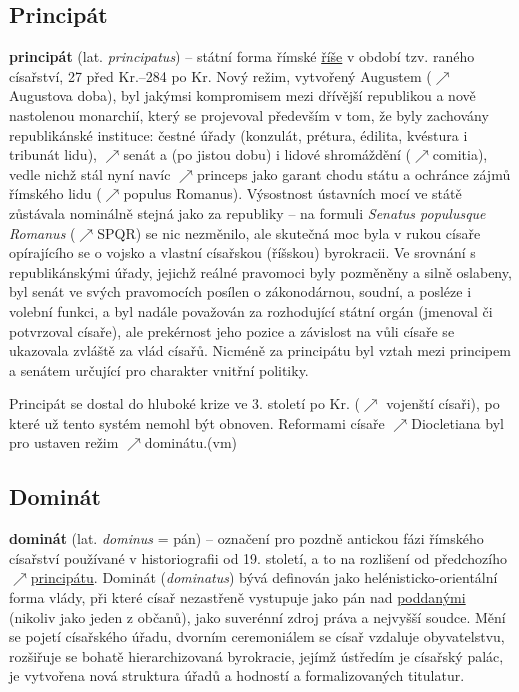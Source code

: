 \documentclass{article}
\begin{document}
  \subsection*{Principát~\cite{Oliva:}}
  \label{sec:principat}

  {\bf principát} (lat. {\it principatus}) -- státní forma římské \hyperref[sec:rise]{říše} v období tzv. raného císařství, 27 před Kr.--284 po Kr. Nový režim, vytvořený Augustem ($\nearrow$Augustova doba), byl jakýmsi kompromisem mezi dřívější republikou a nově nastolenou monarchií, který se projevoval především v tom, že byly zachovány republikánské instituce: čestné úřady (konzulát, prétura, édilita, kvéstura i tribunát lidu), $\nearrow$senát a (po jistou dobu) i lidové shromáždění ($\nearrow$comitia), vedle nichž stál nyní navíc $\nearrow$princeps jako garant chodu státu a ochránce zájmů římského lidu ($\nearrow$populus Romanus). Výsostnost ústavních mocí ve státě zůstávala nominálně stejná jako za republiky -- na formuli {\it Senatus populusque Romanus} ($\nearrow$SPQR) se nic nezměnilo, ale skutečná moc byla v rukou císaře opírajícího se o vojsko a vlastní císařskou (říšskou) byrokracii. Ve srovnání s republikánskými úřady, jejichž reálné pravomoci byly pozměněny a silně oslabeny, byl senát ve svých pravomocích posílen o zákonodárnou, soudní, a posléze i volební funkci, a byl nadále považován za rozhodující státní orgán (jmenoval či potvrzoval císaře), ale prekérnost jeho pozice a závislost na vůli císaře se ukazovala zvláště za vlád  císařů. Nicméně za principátu byl vztah mezi principem a senátem určující pro charakter vnitřní politiky.

  Principát se dostal do hluboké krize ve 3. století po Kr. ($\nearrow$ vojenští císaři), po které už tento systém nemohl být obnoven. Reformami císaře $\nearrow$Diocletiana byl pro  ustaven režim $\nearrow$dominátu.\hfill (vm)

  \subsection*{Dominát~\cite{Oliva:}}
  \label{sec:dominat}

  {\bf dominát} (lat. {\it dominus} = pán) -- označení pro pozdně antickou fázi římského císařství používané v historiografii od 19. století, a to na rozlišení od  předchozího $\nearrow$\hyperref[sec:principat]{principátu}. Dominát ({\it dominatus}) bývá definován jako helénisticko-orientální forma vlády, při které císař nezastřeně vystupuje jako pán nad \hyperref[sec:poddanstvi]{poddanými} (nikoliv jako jeden z občanů), jako suverénní zdroj práva a nejvyšší soudce. Mění se pojetí císařského úřadu, dvorním ceremoniálem se císař vzdaluje obyvatelstvu, rozšiřuje se bohatě hierarchizovaná byrokracie, jejímž ústředím je císařský palác, je vytvořena nová struktura úřadů a hodností a formalizovaných titulatur.
\end{document}
